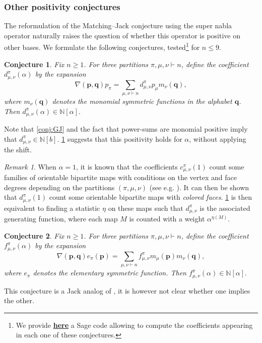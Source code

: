 \documentclass[12pt]{amsart}
\newtheorem{conj}{Conjecture}
\theoremstyle{remark}
\newtheorem{remark}{Remark}
\newcommand{\bfp}{\boldsymbol{p}}
\newcommand{\bfq}{\boldsymbol{q}}
\newcommand{\NN}{\mathbb N}
\begin{document}
\subsubsection{Other positivity conjectures}
The reformulation of the Matching–Jack conjecture using the super nabla operator naturally raises the question of whether this operator is positive on other bases. We formulate the following conjectures, tested\footnote{We provide \textbf{\href{https://github.com/HoucineBenDali/Jack-super-nabla-operator}{here}} a Sage code allowing to compute the coefficients appearing in each one of these conjectures.} for $n\leq 9$.

\begin{conj}\label{conj:monomials}
Fix $n\geq 1$. For three partitions $\pi,\mu,\nu\vdash n$,
define the coefficient $d^\pi_{\mu,\nu}(\alpha)$ by
    the expansion
    $$\nabla(\bfp,\bfq) p_\pi=\sum_{\mu,\nu\vdash n}d^\pi_{\mu,\nu}p_\mu m_\nu(\bfq),$$
    where $m_\nu(\bfq)$ denotes the monomial symmetric functions in the alphabet $\bfq$.
    Then $d^\pi_{\mu,\nu}(\alpha)\in\NN[\alpha].$ 
\end{conj}
Note that \cref{conj:GJ} and the fact that power-sums are monomial positive imply that $d^\pi_{\mu,\nu}\in\NN[b]$. \cref{conj:monomials} suggests that this positivity holds for $\alpha$, without applying the shift.

\begin{remark}
When $\alpha=1$, it is known that the coefficients $c^\pi_{\mu,\nu}(1)$ count some families of orientable bipartite maps with conditions on the vertex and face degrees depending on the partitions $(\pi,\mu,\nu)$ (see e.g. \cite{GouldenJackson1996}). It can then be shown that $d^\pi_{\mu,\nu}(1)$ count some orientable bipartite maps with \textit{colored faces}. \cref{conj:monomials} is then equivalent to finding a statistic $\eta$ on these maps such that $d^\pi_{\mu,\nu}$ is the associated generating function, where each map $M$ is counted with a weight $\alpha^{\eta(M)}$.
\end{remark}



\begin{conj}
Fix $n\geq 1$. For three partitions $\pi,\mu,\nu\vdash n$,
define the coefficient $f^\pi_{\mu,\nu}(\alpha)$ by
    the expansion
    $$\nabla(\bfp,\bfq) e_\pi(\bfp)=\sum_{\mu,\nu\vdash n}f^\pi_{\mu,\nu}m_\mu(\bfp) m_\nu(\bfq),$$
    where $e_\pi$ denotes the elementary symmetric function.
    Then $f^\pi_{\mu,\nu}(\alpha)\in\NN[\alpha].$
\end{conj}
This conjecture is a Jack analog of \cite[Conjecture 7.2]{BergeronHaglundIraciRomero2023}, it is however not clear whether one implies the other.
\end{document}
